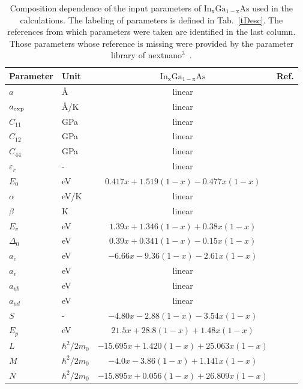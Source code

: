 
\begin{table*}[!ht]
	\caption{Composition dependence of the input parameters of $\mathrm{In_xGa_{1-x}As}$ used in the calculations. The labeling of parameters is defined in Tab.~\ref{tDesc}. The references from which parameters were taken are identified in the last column. Those parameters whose reference is missing were provided by the parameter library of nextnano$^3$~\cite{next}.\label{tSb3}
	}
	\begin{center}
		\begin{tabular}{llcc}
			\hline \hline
			Parameter & Unit & $\mathrm{In_xGa_{1-x}As}$ & Ref.\\
			\hline
			$a$ & \AA & linear & \\
			$a_{\rm exp}$ & \AA /K & linear & \\
			$C_{11}$ & GPa& linear &  \\
			$C_{12}$ & GPa& linear &  \\
			$C_{44}$ & GPa& linear & \\
			$\varepsilon_{r}$ & -& linear & \\
			$E_0$ & eV & $0.417x+1.519(1-x)-0.477x(1-x)$ & \cite{Vurgaftman}\\
			$\alpha$ & eV/K & linear & \\
			$\beta$ & K & linear & \\
			$E_v$ & eV & $1.39x+1.346(1-x)+0.38x(1-x)$& \cite{Vurgaftman}\\
			$\Delta_0$ & eV & $0.39x+0.341(1-x)-0.15x(1-x)$& \cite{Vurgaftman}\\
			$a_c$ & eV & $-6.66x-9.36(1-x)-2.61x(1-x)$& \cite{Vurgaftman}\\
			$a_v$ & eV & linear & \\
			$a_{ub}$ & eV & linear& \\
			$a_{ud}$ & eV & linear& \\
			$S$ & -& $-4.80x-2.88(1-x)-3.54x(1-x)$& \cite{Vurgaftman}\\
			$E_p$ & eV & $21.5x+28.8(1-x)+1.48x(1-x)$& \cite{Vurgaftman}\\
			$L$ & $\hbar^2/2m_0$ & $-15.695x+1.420(1-x)+25.063x(1-x)$& \cite{Vurgaftman}\\
			$M$ & $\hbar^2/2m_0$ & $-4.0x-3.86(1-x)+1.141x(1-x)$& \cite{Vurgaftman}\\
			$N$ & $\hbar^2/2m_0$ & $-15.895x+0.056(1-x)+26.809x(1-x)$& \cite{Vurgaftman}\\
			\hline \hline
		\end{tabular}
	\end{center}
\end{table*}

\newpage 